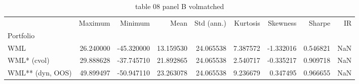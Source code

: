 \begin{table}[htbp]
  \centering
  \caption{table 08 panel B volmatched}
  \label{tab:table_08_panel_B_volmatched}
  \begin{tabular}{lrrrrrrrr}
\toprule
 & Maximum & Minimum & Mean & Std (ann.) & Kurtosis & Skewness & Sharpe & IR \\
Portfolio &  &  &  &  &  &  &  &  \\
\midrule
WML & 26.240000 & -45.320000 & 13.159530 & 24.065538 & 7.387572 & -1.332016 & 0.546821 & NaN \\
WML* (cvol) & 29.888628 & -37.745710 & 21.892865 & 24.065538 & 2.540717 & -0.335217 & 0.909718 & NaN \\
WML** (dyn, OOS) & 49.899497 & -50.947110 & 23.263078 & 24.065538 & 9.236679 & 0.347495 & 0.966655 & NaN \\
\bottomrule
\end{tabular}

\end{table}

